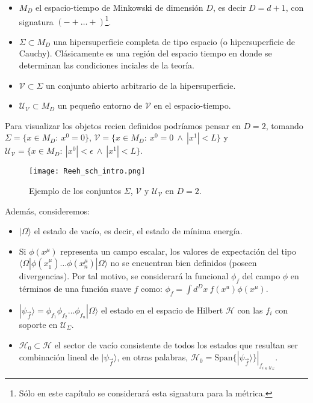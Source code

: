 \begin{itemize}
\item $M_D$ el espacio-tiempo de Minkowski de dimensión $D$, es decir $D=d+1$, con signatura $(-+\ldots+)$\footnote{Sólo en este capítulo se considerará esta signatura para la métrica.}.
\item $\Sigma\subset M_D$ una hipersuperficie completa de tipo espacio (o hipersuperficie de Cauchy). Clásicamente es una región del espacio tiempo en donde se determinan las condiciones inciales de la teoría.
\item $\mathcal{V}\subset \Sigma$ un conjunto abierto arbitrario de la hipersuperficie.
\item $\mathcal{U}_{\mathcal{V}} \subset M_D$ un pequeño entorno de $\mathcal{V}$ en el espacio-tiempo.
\end{itemize}
Para visualizar los objetos recien definidos podríamos pensar en $D=2$, tomando $\Sigma=\{x\in M_D:\: x^0=0\}$, $\mathcal{V}=\{x\in M_D:\: x^0=0\:\wedge\:|x^1|<L\}$ y $\mathcal{U}_{\mathcal{V}}=\{x\in M_D:\: |x^0|<\epsilon\:\wedge\:|x^1|<L\}$.

\begin{figure}[ht]
    \centering
    \texttt{[image: Reeh\_sch\_intro.png]}
    \caption{Ejemplo de los conjuntos $\Sigma$, $\mathcal{V}$ y $\mathcal{U}_{\mathcal{V}}$ en $D=2$.}
    \label{fig:examp}
 \end{figure}

Además, consideremos:
\begin{itemize}
\item $|\Omega\rangle$ el estado de vacío, es decir, el estado de mínima energía.
\item Si $\phi(x^{\mu})$ representa un campo escalar, los valores de expectación del tipo $\langle \Omega |\phi(x^{\mu}_1)\ldots\phi(x^{\mu}_n)|\Omega \rangle$  no se encuentran bien definidos (poseen divergencias). Por tal motivo, se considerará la funcional $\phi_f$ del campo $\phi$ en términos de una función suave $f$ como: $\phi_f=\int d^Dx\:f(x^u)\phi(x^{\mu})$.
\item $|\psi_{\vec{f}}\rangle = \phi_{f_1}\phi_{f_2}\ldots\phi_{f_n}|\Omega\rangle$ el estado en el espacio de Hilbert $\mathcal{H}$ con las $f_i$ con soporte en $\mathcal{U}_{\Sigma}$.
\item $\mathcal{H}_0\subset\mathcal{H}$ el sector de vacío consistente de todos los estados que resultan ser combinación lineal de $|\psi_{\vec{f}}\rangle$, en otras palabras, $\mathcal{H}_0=\text{Span}\{|\psi_{\vec{f}}\rangle\}|_{f_{i\in \mathcal{U}_{\Sigma}}}$.
\end{itemize}

